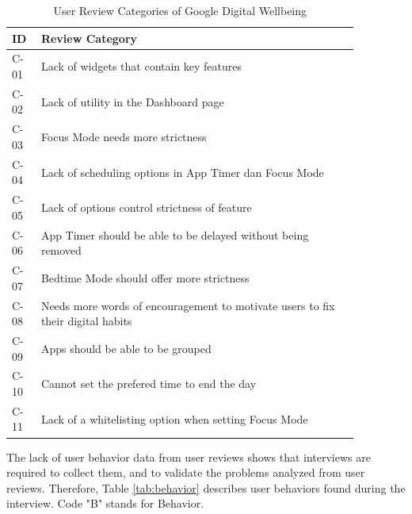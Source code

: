 \documentclass[conference]{IEEEtran}
\begin{document}
\RaggedLeft
\begin{table}[htbp]
  \caption{User Review Categories of Google Digital Wellbeing}
  \begin{footnotesize}
    \begin{center}
      \begin{tabular}{|m{0.07\linewidth}|m{0.8\linewidth}|}
        \hline
        \centering\textbf{ID} & \textbf{Review Category}\\ \hline
      \centering C-01    & Lack of widgets that contain key features \\ \hline
      \centering C-02    & Lack of utility in the Dashboard page \\ \hline
      \centering C-03    & Focus Mode needs more strictness \\ \hline
      \centering C-04    & Lack of scheduling options in App Timer dan Focus Mode \\ \hline
      \centering C-05    & Lack of options control strictness of feature \\ \hline
      \centering C-06    & App Timer should be able to be delayed without being removed \\ \hline
      \centering C-07    & Bedtime Mode should offer more strictness \\ \hline
      \centering C-08    & Needs more words of encouragement to motivate users to fix their digital habits \\ \hline
      \centering C-09    & Apps should be able to be grouped \\ \hline
      \centering C-10    & Cannot set the prefered time to end the day \\ \hline
      \centering C-11    & Lack of a whitelisting option when setting Focus Mode \\ \hline
    \end{tabular}
    \label{tab:reviews}
  \end{center}
\end{footnotesize}
\end{table}
\justifying

The lack of user behavior data from user reviews shows that interviews are required to collect them, and to validate the problems analyzed from user reviews. Therefore, Table \ref{tab:behavior} describes user behaviors found during the interview. Code "B" stands for Behavior.
\end{document}
